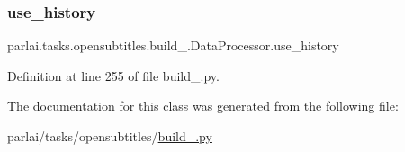 \subsubsection{\texorpdfstring{use\+\_\+history}{use\_history}}
{\footnotesize\ttfamily parlai.\+tasks.\+opensubtitles.\+build\+\_.\+Data\+Processor.\+use\+\_\+history}



Definition at line 255 of file build\+\_.\+py.



The documentation for this class was generated from the following file\+:\begin{DoxyCompactItemize}
\item 
parlai/tasks/opensubtitles/\hyperlink{build__2018_8py}{build\+\_.\+py}\end{DoxyCompactItemize}

